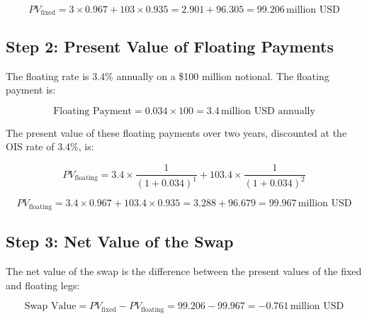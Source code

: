 \documentclass[12pt,letterpaper, onecolumn]{exam}
\begin{document}
\begin{questions}
\begin{solution}
\[
PV_{\text{fixed}} = 3 \times 0.967 + 103 \times 0.935 = 2.901 + 96.305 = 99.206 \, \text{million USD}
\]

\subsection*{Step 2: Present Value of Floating Payments}
The floating rate is 3.4\% annually on a \$100 million notional. The floating payment is:

\[
\text{Floating Payment} = 0.034 \times 100 = 3.4 \, \text{million USD annually}
\]

The present value of these floating payments over two years, discounted at the OIS rate of 3.4\%, is:

\[
PV_{\text{floating}} = 3.4 \times \frac{1}{(1 + 0.034)^1} + 103.4 \times \frac{1}{(1 + 0.034)^2}
\]

\[
PV_{\text{floating}} = 3.4 \times 0.967 + 103.4 \times 0.935 = 3.288 + 96.679 = 99.967 \, \text{million USD}
\]

\subsection*{Step 3: Net Value of the Swap}
The net value of the swap is the difference between the present values of the fixed and floating legs:

\[
\text{Swap Value} = PV_{\text{fixed}} - PV_{\text{floating}} = 99.206 - 99.967 = -0.761 \, \text{million USD}
\]

\end{solution}
    
\end{questions}
\end{document}
